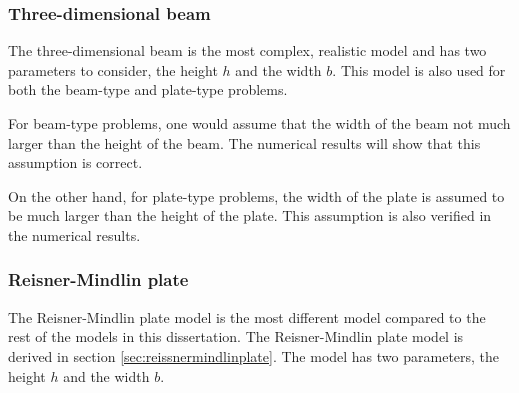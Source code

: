 \documentclass[../../main.tex]{subfiles}
\begin{document}
\subsubsection{Three-dimensional beam}

The three-dimensional beam is the most complex, realistic model and has two parameters to consider, the height $h$ and the width $b$. This model is also used for both the beam-type and plate-type problems.

For beam-type problems, one would assume that the width of the beam not much larger than the height of the beam. The numerical results will show that this assumption is correct.

On the other hand, for plate-type problems, the width of the plate is assumed to be much larger than the height of the plate. This assumption is also verified in the numerical results.

\subsubsection{Reisner-Mindlin plate}
The Reisner-Mindlin plate model is the most different model compared to the rest of the models in this dissertation. The Reisner-Mindlin plate model is derived in section \ref{sec:reissnermindlinplate}. The model has two parameters, the height $h$ and the width $b$.
\end{document}
